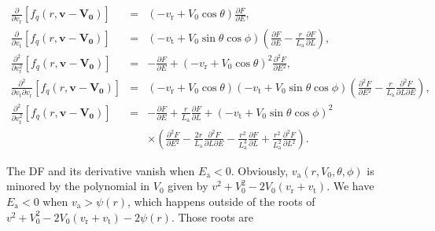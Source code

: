 \documentclass[11pt]{article}
\newcommand{\rt}{\mathrm{t}}
\newcommand{\rr}{\mathrm{r}}
\newcommand{\vr}{v_{\rr}}
\newcommand{\vt}{v_{\rt}}
\newcommand{\bv}{\boldsymbol{v}}
\newcommand{\fq}{f_{q}}
\newcommand{\ra}{\mathrm{a}}
\newcommand{\va}{v_{\ra}}
\newcommand{\bV}[1]{\boldsymbol{V_{#1}}}
\newcommand{\Ea}{E_{\ra}}
\newcommand{\La}{L_{\ra}}
\begin{document}
\begin{equation}
\begin{array}{ccl}
  \displaystyle{\frac{\partial}{\partial \vr}\left[\fq(r,\bv-\bV0)\right]} & =&\displaystyle{\left(-\vr+V_{0}\cos\theta\right)\frac{\partial F}{\partial E}} ,\\
  
   \displaystyle{\frac{\partial}{\partial \vt}\left[\fq(r,\bv-\bV0)\right]} & =&\displaystyle{\left(-\vt+V_{0}\sin\theta\cos\phi\right)\left(\frac{\partial F}{\partial E}-\frac{r}{\La}\frac{\partial F}{\partial L}\right)} ,\\
 
  \displaystyle{\frac{\partial^{2}}{\partial \vr^{2}}\left[\fq(r,\bv-\bV0)\right]} & =&\displaystyle{-\frac{\partial F}{\partial E}+\left(-\vr+V_{0}\cos\theta\right)^{2}\frac{\partial^{2}F}{\partial E{}^{2}}} ,\\
 
  \displaystyle{\frac{\partial^{2}}{\partial \vt\partial \vr}\left[\fq(r,\bv-\bV0)\right]} & =&\displaystyle{\left(-\vr+V_{0}\cos\theta\right)\left(-\vt+V_{0}\sin\theta\cos\phi\right)\left(\frac{\partial^{2}F}{\partial E{}^{2}}-\frac{r}{\La}\frac{\partial^{2}F}{\partial L\partial E}\right)} ,\\
 
  \displaystyle{\frac{\partial^{2}}{\partial \vt^{2}}\left[\fq(r,\bv-\bV0)\right]} & =&\displaystyle{-\frac{\partial F}{\partial E}+\frac{r}{\La}\frac{\partial F}{\partial L}+\left(-\vt+V_{0}\sin\theta\cos\phi\right)^{2}} \\
  {}&{}&\times \displaystyle{\left(\frac{\partial^{2}F}{\partial E{}^{2}}-\frac{2r}{\La}\frac{\partial^{2}F}{\partial L\partial E}-\frac{r^{2}}{\La^{3}}\frac{\partial F}{\partial L}+\frac{r^{2}}{\La^{2}}\frac{\partial^{2}F}{\partial L{}^{2}}\right)} .
\end{array}
\label{eq:DF_Derivatives}
\end{equation}

The DF and its derivative vanish when $\Ea<0$. Obviously, $\va(r,V_{0},\theta,\phi)$ is minored by the polynomial in $V_{0}$ given by $v^{2}+V_{0}^{2}-2V_{0}(\vr+\vt)$. We have $\Ea<0$ when $\va>\psi(r)$, which happens outside of the roots of $v^{2}+V_{0}^{2}-2V_{0}(\vr+\vt)-2\psi(r)$. Those roots are
\end{document}
